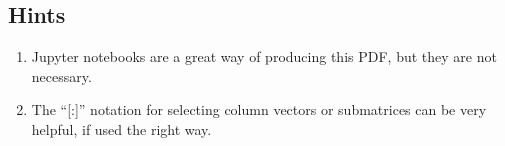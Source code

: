 \documentclass[a4paper]{article}
\begin{document}
\subsection*{Hints}
\begin{enumerate}
\item Jupyter notebooks are a great way of producing this PDF, but
  they are not necessary.
\item The ``[:]'' notation for selecting column vectors or submatrices
  can be very helpful, if used the right way.
\end{enumerate}
\end{document}
